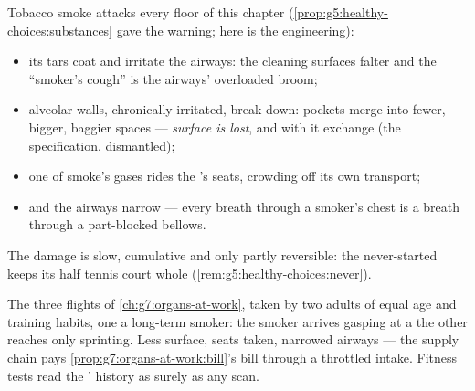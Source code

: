 \begin{proposition}\label{prop:g7:lungs-and-gas-exchange:smoke}
Tobacco smoke attacks every floor of this chapter
(\cref{prop:g5:healthy-choices:substances} gave the
warning; here is the engineering):
\begin{itemize}
  \item its tars coat and irritate the airways: the
        cleaning surfaces falter and the ``smoker's
        cough'' is the airways' overloaded broom;
  \item alveolar walls, chronically irritated, break
        down: pockets merge into fewer, bigger, baggier
        spaces --- \emph{surface is lost}, and with it
        exchange (the specification, dismantled);
  \item one of smoke's gases rides the 's 
        seats, crowding  off its own transport;
  \item and the airways narrow --- every breath through a
        smoker's chest is a breath through a part-blocked
        bellows.
\end{itemize}
The damage is slow, cumulative and only partly
reversible: the never-started  keeps its half tennis
court whole (\cref{rem:g5:healthy-choices:never}).
\end{proposition}
\admitted

\begin{example}\label{ex:g7:lungs-and-gas-exchange:stairs}
The three flights of \cref{ch:g7:organs-at-work}, taken
by two adults of equal age and training habits, one a
long-term smoker: the smoker arrives gasping at a 
the other reaches only sprinting. Less surface, seats
taken, narrowed airways --- the supply chain pays
\cref{prop:g7:organs-at-work:bill}'s bill through a
throttled intake. Fitness tests read the ' history
as surely as any scan.
\end{example}

